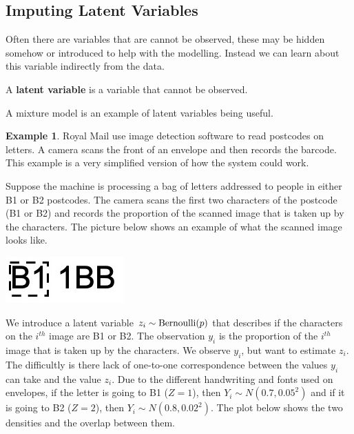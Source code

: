 \documentclass[
]{book}
\theoremstyle{definition}
\theoremstyle{definition}
\newtheorem{example}{Example}[chapter]
\theoremstyle{definition}
\theoremstyle{definition}
\theoremstyle{remark}
\begin{document}
\hypertarget{imputing-latent-variables}{%
\subsection{Imputing Latent Variables}\label{imputing-latent-variables}}

Often there are variables that are cannot be observed, these may be hidden somehow or introduced to help with the modelling. Instead we can learn about this variable indirectly from the data.

A \textbf{latent variable} is a variable that cannot be observed.

A mixture model is an example of latent variables being useful.

\begin{example}

Royal Mail use image detection software to read postcodes on letters. A camera scans the front of an envelope and then records the barcode. This example is a very simplified version of how the system could work.

Suppose the machine is processing a bag of letters addressed to people in either B1 or B2 postcodes. The camera scans the first two characters of the postcode (B1 or B2) and records the proportion of the scanned image that is taken up by the characters. The picture below shows an example of what the scanned image looks like.

\includegraphics{postcode.jpeg}

We introduce a latent variable \(z_i \sim \hbox{Bernoulli}(p)\) that describes if the characters on the \(i^{th}\) image are B1 or B2. The observation \(y_i\) is the proportion of the \(i^{th}\) image that is taken up by the characters. We observe \(y_i\), but want to estimate \(z_i\). The difficultly is there lack of one-to-one correspondence between the values \(y_i\) can take and the value \(z_i\). Due to the different handwriting and fonts used on envelopes, if the letter is going to B1 (\(Z = 1\)), then \(Y_i \sim N(0.7, 0.05^2)\) and if it is going to B2 (\(Z = 2\)), then \(Y_i \sim N(0.8, 0.02^2)\). The plot below shows the two densities and the overlap between them.


\end{example}
\end{document}
